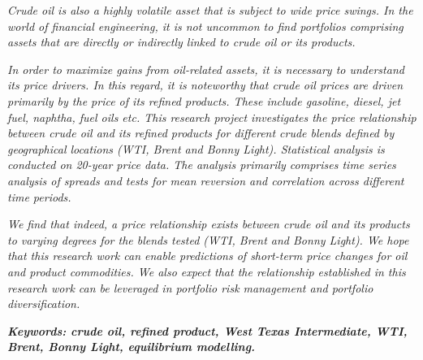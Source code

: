 \documentclass[12pt,twoside]{article}
\begin{document}
\begin{justify}
{\fontsize{11pt}{13.2pt}\selectfont \textit{Crude oil is also a highly volatile asset that is subject to wide price swings. In the world of financial engineering, it is not uncommon to find portfolios comprising assets that are directly or indirectly linked to crude oil or its products.}\par}
\end{justify}\par

\begin{justify}
{\fontsize{11pt}{13.2pt}\selectfont \textit{In order to maximize gains from oil-related assets, it is necessary to understand its price drivers. In this regard, it is noteworthy that crude oil prices are driven primarily by the price of its refined products. These include gasoline, diesel, jet fuel, naphtha, fuel oils etc. This research project investigates the price relationship between crude oil and its refined products for different crude blends defined by geographical locations (WTI, Brent and Bonny Light). Statistical analysis is conducted on 20-year price data. The analysis primarily comprises time series analysis of spreads and tests for mean reversion and correlation across different time periods.}\par}
\end{justify}\par

\begin{justify}
{\fontsize{11pt}{13.2pt}\selectfont \textit{We find that indeed, a price relationship exists between crude oil and its products to varying degrees for the blends tested (WTI, Brent and Bonny Light). We hope that this research work can enable predictions of short-term price changes for oil and product commodities. We also expect that the relationship established in this research work can be leveraged in portfolio risk management and portfolio diversification.}\par}
\end{justify}\par

\begin{justify}
{\fontsize{11pt}{13.2pt}\selectfont \textit{}\par}
\end{justify}
\vspace{\baselineskip}\begin{justify}
{\fontsize{11pt}{13.2pt}\selectfont \textit{\textbf{Keywords: crude oil, refined product, West Texas Intermediate, WTI, Brent, Bonny Light, equilibrium modelling.}}\par}
\end{justify}\par
\end{document}
